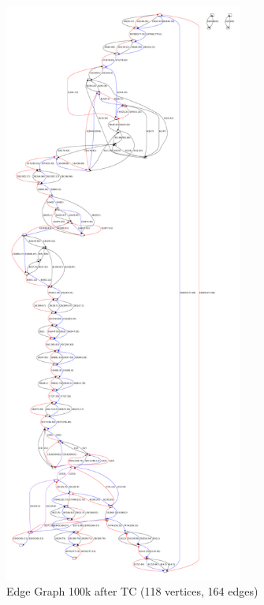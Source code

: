 \documentclass[14pt]{article}
\begin{document}
\newpage

\begin{figure}
\begin{center}
\includegraphics[width=0.7\textwidth]{tips_clipped.pdf}
\end{center}
\caption{Edge Graph 100k after TC (118 vertices, 164 edges)}
\end{figure}

\newpage
\end{document}
